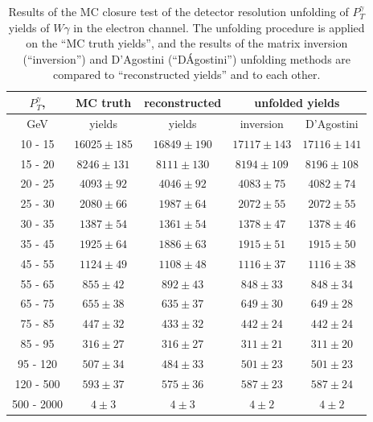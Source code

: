 \begin{table}[h]
  \scriptsize
  \begin{center}
  \caption{Results of the MC closure test of the detector resolution unfolding of $P_T^{\gamma}$ yields of $W\gamma$ in the electron channel. The unfolding procedure is applied on the ``MC truth yields'', and the results of the matrix inversion (``inversion'') and D'Agostini (``D\'Agostini'') unfolding methods are compared to ``reconstructed yields'' and to each other. }
  \begin{tabular}{|c|c|c|c|c|}
  \hline
  $P_T^{\gamma}$, &  MC truth         &   reconstructed          &  \multicolumn{2}{|c|}{unfolded yields} \\ \hline
  GeV &  yields       &       yields        &  inversion &  D'Agostini \\ \hline
 10 -  15 &     $16025\pm 185$ &     $16849\pm 190$ &     $17117\pm143$ &     $17116\pm141$ \\ 
 15 -  20 &     $8246\pm 131$ &     $8111\pm 130$ &     $8194\pm109$ &     $8196\pm108$ \\ \hline
 20 -  25 &     $4093\pm  92$ &     $4046\pm  92$ &     $4083\pm75$ &     $4082\pm74$ \\ \hline
 25 -  30 &     $2080\pm  66$ &     $1987\pm  64$ &     $2072\pm55$ &     $2072\pm55$ \\ \hline
 30 -  35 &     $1387\pm  54$ &     $1361\pm  54$ &     $1378\pm47$ &     $1378\pm46$ \\ \hline
 35 -  45 &     $1925\pm  64$ &     $1886\pm  63$ &     $1915\pm51$ &     $1915\pm50$ \\ \hline
 45 -  55 &     $1124\pm  49$ &     $1108\pm  48$ &     $1116\pm37$ &     $1116\pm38$ \\ \hline
 55 -  65 &     $855\pm  42$ &     $892\pm  43$ &     $848\pm33$ &     $848\pm34$ \\ \hline
 65 -  75 &     $655\pm  38$ &     $635\pm  37$ &     $649\pm30$ &     $649\pm28$ \\ \hline
 75 -  85 &     $447\pm  32$ &     $433\pm  32$ &     $442\pm24$ &     $442\pm24$ \\ \hline
 85 -  95 &     $316\pm  27$ &     $316\pm  27$ &     $311\pm21$ &     $311\pm20$ \\ \hline
 95 - 120 &     $507\pm  34$ &     $484\pm  33$ &     $501\pm23$ &     $501\pm23$ \\ \hline
120 - 500 &     $593\pm  37$ &     $575\pm  36$ &     $587\pm23$ &     $587\pm24$ \\ \hline
500 - 2000 &     $4\pm   3$ &     $4\pm   3$ &     $4\pm2$ &     $4\pm2$ \\ \hline
  \end{tabular}
  \label{tab:unf_mc_closure_ELECTRON_WGamma}
  \end{center}
\end{table}

